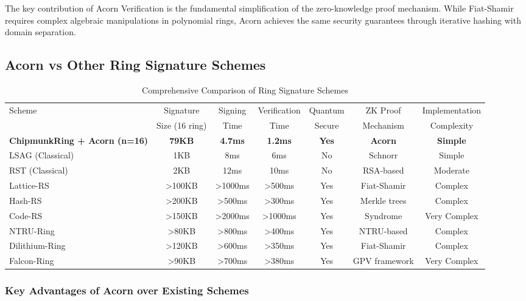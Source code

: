 \documentclass[11pt,a4paper]{article}
\begin{document}
The key contribution of Acorn Verification is the fundamental simplification of the zero-knowledge proof mechanism. While Fiat-Shamir requires complex algebraic manipulations in polynomial rings, Acorn achieves the same security guarantees through iterative hashing with domain separation.

\subsection{Acorn vs Other Ring Signature Schemes}

\begin{table}[h]
\centering
\caption{Comprehensive Comparison of Ring Signature Schemes}
\label{tab:comprehensive-comparison}
\begin{tabular}{@{}lcccccc@{}}
\toprule
\multirow{2}{*}{Scheme} & Signature & Signing & Verification & Quantum & ZK Proof & Implementation \\
 & Size (16 ring) & Time & Time & Secure & Mechanism & Complexity \\
\midrule
\textbf{ChipmunkRing + Acorn (n=16)} & \textbf{79KB} & \textbf{4.7ms} & \textbf{1.2ms} & \textbf{Yes} & \textbf{Acorn} & \textbf{Simple} \\
LSAG (Classical) & 1KB & 8ms & 6ms & No & Schnorr & Simple \\
RST (Classical) & 2KB & 12ms & 10ms & No & RSA-based & Moderate \\
Lattice-RS \cite{lattice-rings} & >100KB & >1000ms & >500ms & Yes & Fiat-Shamir & Complex \\
Hash-RS \cite{hash-rings} & >200KB & >500ms & >300ms & Yes & Merkle trees & Complex \\
Code-RS \cite{code-rings} & >150KB & >2000ms & >1000ms & Yes & Syndrome & Very Complex \\
NTRU-Ring & >80KB & >800ms & >400ms & Yes & NTRU-based & Complex \\
Dilithium-Ring & >120KB & >600ms & >350ms & Yes & Fiat-Shamir & Complex \\
Falcon-Ring & >90KB & >700ms & >380ms & Yes & GPV framework & Very Complex \\
\bottomrule
\end{tabular}
\end{table}

\subsubsection{Key Advantages of Acorn over Existing Schemes}
\end{document}
